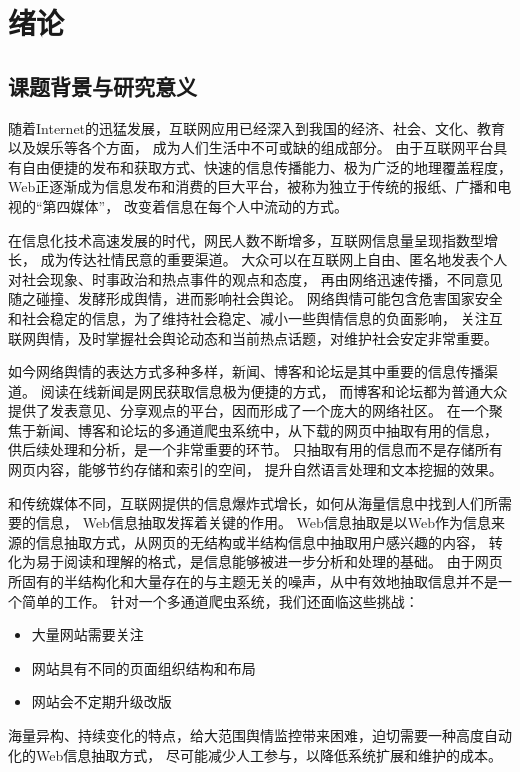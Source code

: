 
\chapter{绪论}

\section{课题背景与研究意义}
随着Internet的迅猛发展，互联网应用已经深入到我国的经济、社会、文化、教育以及娱乐等各个方面，
成为人们生活中不可或缺的组成部分。
由于互联网平台具有自由便捷的发布和获取方式、快速的信息传播能力、极为广泛的地理覆盖程度，
Web正逐渐成为信息发布和消费的巨大平台，被称为独立于传统的报纸、广播和电视的“第四媒体”，
改变着信息在每个人中流动的方式。

在信息化技术高速发展的时代，网民人数不断增多，互联网信息量呈现指数型增长，
成为传达社情民意的重要渠道。
大众可以在互联网上自由、匿名地发表个人对社会现象、时事政治和热点事件的观点和态度，
再由网络迅速传播，不同意见随之碰撞、发酵形成舆情，进而影响社会舆论。
网络舆情可能包含危害国家安全和社会稳定的信息，为了维持社会稳定、减小一些舆情信息的负面影响，
关注互联网舆情，及时掌握社会舆论动态和当前热点话题，对维护社会安定非常重要。

如今网络舆情的表达方式多种多样，新闻、博客和论坛是其中重要的信息传播渠道。
阅读在线新闻是网民获取信息极为便捷的方式，
而博客和论坛都为普通大众提供了发表意见、分享观点的平台，因而形成了一个庞大的网络社区。
在一个聚焦于新闻、博客和论坛的多通道爬虫系统中，从下载的网页中抽取有用的信息，
供后续处理和分析，是一个非常重要的环节。
只抽取有用的信息而不是存储所有网页内容，能够节约存储和索引的空间，
提升自然语言处理和文本挖掘的效果。

和传统媒体不同，互联网提供的信息爆炸式增长，如何从海量信息中找到人们所需要的信息，
Web信息抽取发挥着关键的作用。
Web信息抽取是以Web作为信息来源的信息抽取方式，从网页的无结构或半结构信息中抽取用户感兴趣的内容，
转化为易于阅读和理解的格式，是信息能够被进一步分析和处理的基础。
由于网页所固有的半结构化和大量存在的与主题无关的噪声，从中有效地抽取信息并不是一个简单的工作。
针对一个多通道爬虫系统，我们还面临这些挑战：
\begin{itemize}
\item 大量网站需要关注
\item 网站具有不同的页面组织结构和布局
\item 网站会不定期升级改版
\end{itemize}

海量异构、持续变化的特点，给大范围舆情监控带来困难，迫切需要一种高度自动化的Web信息抽取方式，
尽可能减少人工参与，以降低系统扩展和维护的成本。

